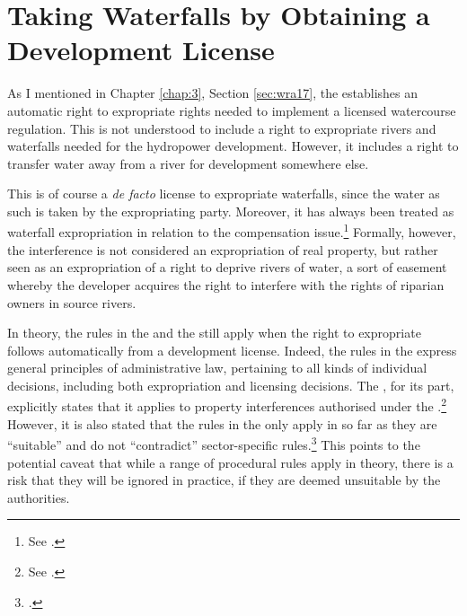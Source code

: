 \section{Taking Waterfalls by Obtaining a Development License}\label{sec:special}

As I mentioned in Chapter \ref{chap:3}, Section \ref{sec:wra17}, the \cite{wra17} establishes an automatic right to expropriate rights needed to implement a licensed watercourse regulation. This is not understood to include a right to expropriate rivers and waterfalls needed for the hydropower development. However, it includes a right to transfer water away from a river for development somewhere else. 

This is of course a {\it de facto} license to expropriate waterfalls, since the water as such is taken by the expropriating party. Moreover, it has always been treated as waterfall expropriation in relation to the compensation issue.\footnote{See \cite{jorpeland11}.} Formally, however, the interference is not considered an expropriation of real property, but rather seen as an expropriation of a right to deprive rivers of water, a sort of easement whereby the developer acquires the right to interfere with the rights of riparian owners in source rivers.

In theory, the rules in the \cite{ea59} and the \cite{paa67} still apply when the right to expropriate follows automatically from a development license. Indeed, the rules in the \cite{paa67} express general principles of administrative law, pertaining to all kinds of individual decisions, including both expropriation and licensing decisions. The \cite{ea59}, for its part, explicitly states that it applies to property interferences authorised under the \cite{wra17}.\footnote{See \cite[30]{ea59}.} However, it is also stated that the rules in the \cite{ea59} only apply in so far as they are ``suitable'' and do not ``contradict'' sector-specific rules.\footcite[30]{ea59} This points to the potential caveat that while a range of procedural rules apply in theory, there is a risk that they will be ignored in practice, if they are deemed unsuitable by the authorities.

